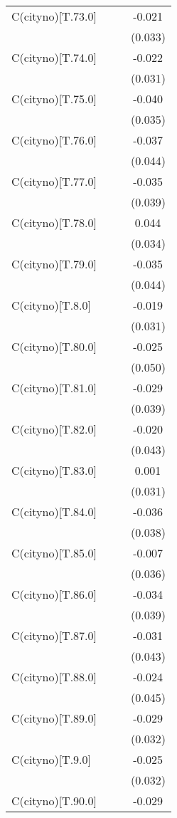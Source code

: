 \begin{table}[!htbp]
\begin{tabular}{@{\extracolsep{5pt}}lccc}
 C(cityno)[T.73.0] & & & -0.021$^{}$ \\
& & & (0.033) \\
 C(cityno)[T.74.0] & & & -0.022$^{}$ \\
& & & (0.031) \\
 C(cityno)[T.75.0] & & & -0.040$^{}$ \\
& & & (0.035) \\
 C(cityno)[T.76.0] & & & -0.037$^{}$ \\
& & & (0.044) \\
 C(cityno)[T.77.0] & & & -0.035$^{}$ \\
& & & (0.039) \\
 C(cityno)[T.78.0] & & & 0.044$^{}$ \\
& & & (0.034) \\
 C(cityno)[T.79.0] & & & -0.035$^{}$ \\
& & & (0.044) \\
 C(cityno)[T.8.0] & & & -0.019$^{}$ \\
& & & (0.031) \\
 C(cityno)[T.80.0] & & & -0.025$^{}$ \\
& & & (0.050) \\
 C(cityno)[T.81.0] & & & -0.029$^{}$ \\
& & & (0.039) \\
 C(cityno)[T.82.0] & & & -0.020$^{}$ \\
& & & (0.043) \\
 C(cityno)[T.83.0] & & & 0.001$^{}$ \\
& & & (0.031) \\
 C(cityno)[T.84.0] & & & -0.036$^{}$ \\
& & & (0.038) \\
 C(cityno)[T.85.0] & & & -0.007$^{}$ \\
& & & (0.036) \\
 C(cityno)[T.86.0] & & & -0.034$^{}$ \\
& & & (0.039) \\
 C(cityno)[T.87.0] & & & -0.031$^{}$ \\
& & & (0.043) \\
 C(cityno)[T.88.0] & & & -0.024$^{}$ \\
& & & (0.045) \\
 C(cityno)[T.89.0] & & & -0.029$^{}$ \\
& & & (0.032) \\
 C(cityno)[T.9.0] & & & -0.025$^{}$ \\
& & & (0.032) \\
 C(cityno)[T.90.0] & & & -0.029$^{}$ \\

\end{tabular}
\end{table}
